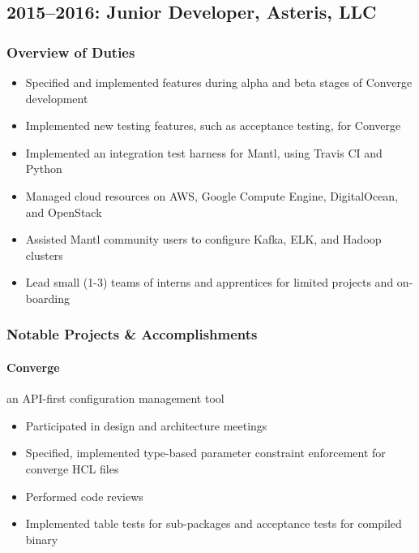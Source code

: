 \documentclass[11pt]{article}
\begin{document}
\subsection*{2015--2016: Junior Developer, Asteris, LLC}

\subsubsection*{Overview of Duties}
\begin{itemize}[noitemsep,leftmargin=1em]
	\item Specified and implemented features during alpha and beta stages of Converge development
	\item Implemented new testing features, such as acceptance testing, for Converge
	\item Implemented an integration test harness for Mantl, using Travis CI and Python
	\item Managed cloud resources on AWS, Google Compute Engine, DigitalOcean, and OpenStack
	\item Assisted Mantl community users to configure Kafka, ELK, and Hadoop clusters
	\item Lead small (1-3) teams of interns and apprentices for limited projects and on-boarding
\end{itemize}
\subsubsection*{Notable Projects \& Accomplishments}

\paragraph{Converge} an API-first configuration management tool
\begin{itemize}[noitemsep,leftmargin=1em]
	\item Participated in design and architecture meetings
	\item Specified, implemented type-based parameter constraint enforcement for converge HCL files
	\item Performed code reviews
	\item Implemented table tests for sub-packages and acceptance tests for compiled binary
\end{itemize}
\end{document}
